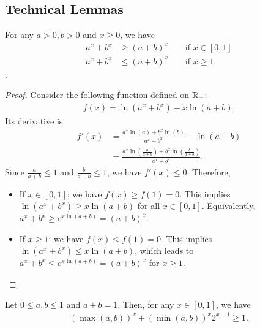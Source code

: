 \subsection{Technical Lemmas}
\label{sec:technicallemmas}
\begin{lemma}
    For any $a > 0, b > 0$ and $x \geq 0$, we have 
    \begin{align}
        a^x + b^x &\geq (a+b)^x \qquad\text{if }x \in [0,1] \\
        a^x + b^x &\leq (a+b)^x \qquad\text{if }x \geq 1.
    \end{align}.
    \label{lemma:axbxlargerthanaplusbx}
\end{lemma}
\begin{proof}
    Consider the following function defined on $\mathbb{R}_+$: 
    \begin{align}
        f(x) = \ln(a^x + b^x) - x\ln(a+b).
    \end{align}
    Its derivative is
    \begin{align}
        f'(x) &= \frac{a^x \ln(a) + b^x \ln(b)}{a^x + b^x} - \ln(a+b) \\
        &= \frac{a^x \ln(\frac{a}{a+b}) + b^x \ln(\frac{b}{a+b}) }{a^x + b^x}.
    \end{align}
    Since $\frac{a}{a+b} \leq 1$ and $\frac{b}{a+b} \leq 1$, we have $f'(x) \leq 0$. Therefore, 
    \begin{itemize}
        \item If $x \in [0,1]$: we have $f(x) \geq f(1) = 0$. This implies $\ln(a^x + b^x) \geq x\ln(a+b)$ for all $x \in [0,1]$. Equivalently, $a^x + b^x \geq e^{x\ln(a+b)} = (a+b)^x$.
        \item If $x \geq 1$: we have $f(x) \leq f(1) = 0$. This implies $\ln(a^x + b^x) \leq x\ln(a+b)$, which leads to $a^x + b^x \leq e^{x\ln(a+b)} = (a+b)^x$ for $x \geq 1$.
    \end{itemize}
   
\end{proof}
\begin{lemma}
    Let $0 \leq a, b \leq 1$ and $a + b = 1$. Then, for any $x \in [0, 1]$, we have
    \begin{align}
        (\max(a, b))^x + (\min(a,b))^x 2^{x-1} \geq 1.
    \end{align}
    \label{lemma:apowerxbpowerxtwopowerx}
\end{lemma}
